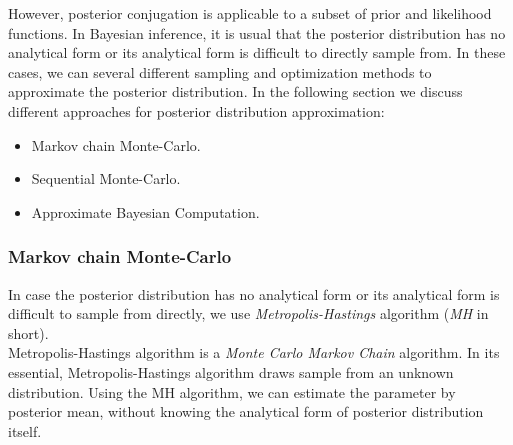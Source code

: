 However, posterior conjugation is applicable to a subset of prior and likelihood functions. In
Bayesian inference, it is usual that the posterior distribution has no analytical form or its
analytical form is difficult to directly sample from. In these cases, we can several different
sampling and optimization methods to approximate the posterior distribution. In the following
section we discuss different approaches for posterior distribution approximation:
\begin{itemize}
    \item Markov chain Monte-Carlo.
    \item Sequential Monte-Carlo.
    \item Approximate Bayesian Computation.
\end{itemize}

\subsubsection{Markov chain Monte-Carlo}
In case the posterior distribution has no analytical form or its analytical form
is difficult to sample from directly, we use \textit{Metropolis-Hastings}
algorithm (\textit{MH} in short).\\
Metropolis-Hastings algorithm is a \textit{Monte Carlo Markov Chain} algorithm.
In its essential, Metropolis-Hastings algorithm draws sample from an unknown distribution.
Using the MH algorithm, we can estimate the parameter by posterior mean, without
knowing the analytical form of posterior distribution itself.

